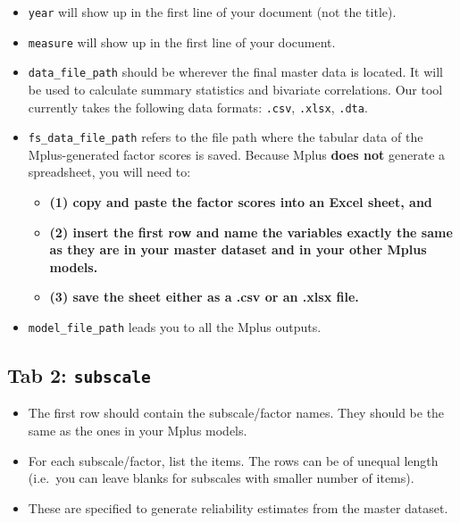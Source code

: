 \documentclass[
]{book}
\begin{document}
\begin{itemize}
\item
  \texttt{year} will show up in the first line of your document (not the title).
\item
  \texttt{measure} will show up in the first line of your document.
\item
  \texttt{data\_file\_path} should be wherever the final master data is located. It will be used to calculate summary statistics and bivariate correlations. Our tool currently takes the following data formats: \texttt{.csv}, \texttt{.xlsx}, \texttt{.dta}.
\item
  \texttt{fs\_data\_file\_path} refers to the file path where the tabular data of the Mplus-generated factor scores is saved. Because Mplus \textbf{does not} generate a spreadsheet, you will need to:

  \begin{itemize}
  \item
    \textbf{(1) copy and paste the factor scores into an Excel sheet, and}
  \item
    \textbf{(2) insert the first row and name the variables exactly the same as they are in your master dataset and in your other Mplus models.}
  \item
    \textbf{(3) save the sheet either as a .csv or an .xlsx file.}
  \end{itemize}
\item
  \texttt{model\_file\_path} leads you to all the Mplus outputs.
\end{itemize}

\hypertarget{tab-2-subscale}{%
\subsection{\texorpdfstring{Tab 2: \texttt{subscale}}{Tab 2: subscale}}\label{tab-2-subscale}}

\begin{itemize}
\item
  The first row should contain the subscale/factor names. They should be the same as the ones in your Mplus models.
\item
  For each subscale/factor, list the items. The rows can be of unequal length (i.e.~you can leave blanks for subscales with smaller number of items).
\item
  These are specified to generate reliability estimates from the master dataset.
\end{itemize}
\end{document}
